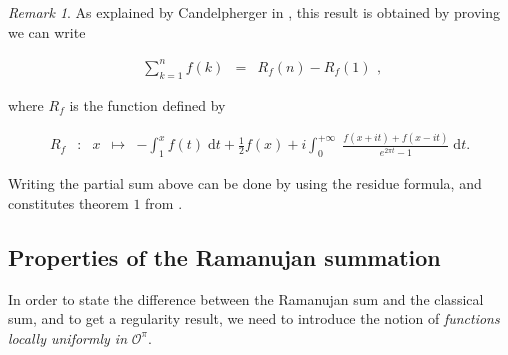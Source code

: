 \documentclass{jams-l}
\theoremstyle{definition}
\theoremstyle{remark}
\newtheorem{remark}[theorem]{Remark}
\numberwithin{equation}{section}
\begin{document}
        \begin{remark}
        
            As explained by Candelpherger in \cite[Sec. 1.4.3]{MR3677185}, this result is obtained by proving we can write
            
            \[ \begin{array}{lll}
                    \sum\limits_{k=1}^n f \left( k \right) & = & R_f \left( n \right) - R_f \left( 1 \right)
                \end{array} , \]
            
            \noindent where $R_f$ is the function defined by
            
            \[ \begin{array}{lllll}
                    R_f & : & x & \longmapsto & - \int_1^x f \left( t \right) \; \mathrm{d}t + \frac{1}{2} f \left( x \right) + i \int_0^{+ \infty} \; \frac{f \left( x + it \right) + f \left( x - it \right)}{e^{2 \pi t} - 1} \; \mathrm{d}t.
                \end{array} \]
            
            \noindent Writing the partial sum above can be done by using the residue formula, and constitutes theorem $1$ from \cite[Sec. 1.3.2]{MR3677185}.
        
        \end{remark}
        
    
    \subsection{Properties of the Ramanujan summation}
        
        In order to state the difference between the Ramanujan sum and the classical sum, and to get a regularity result, we need to introduce the notion of \textit{functions locally uniformly in} $\mathcal{O}^{\pi}$.
        
\end{document}
